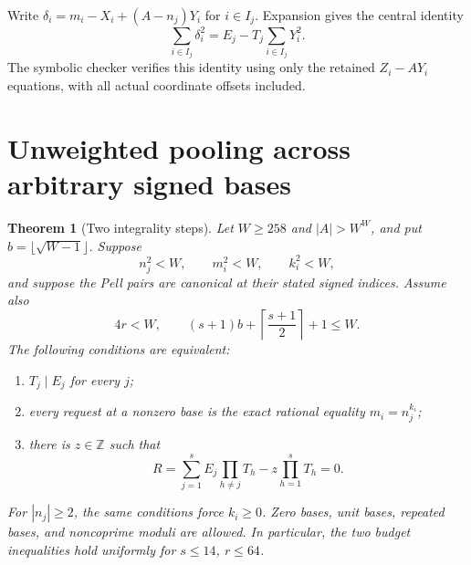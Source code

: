 \documentclass[10pt,letterpaper]{article}
\newtheorem{theorem}{Theorem}[section]
\theoremstyle{remark}\newtheorem{remark}[theorem]{Remark}
\newcommand{\Z}{\mathbb Z}\newcommand{\Q}{\mathbb Q}\newcommand{\N}{\mathbb N}
\begin{document}
Write $\delta_i=m_i-X_i+(A-n_j)Y_i$ for $i\in I_j$. Expansion gives
the central identity
\begin{equation}
 \sum_{i\in I_j}\delta_i^2
 =E_j-T_j\sum_{i\in I_j}Y_i^2.\label{eq:normidentity}
\end{equation}
The symbolic checker verifies this identity using only the retained
$Z_i-AY_i$ equations, with all actual coordinate offsets included.

\section{Unweighted pooling across arbitrary signed bases}

\begin{theorem}[Two integrality steps]\label{thm:main}
Let $W\ge258$ and $|A|>W^W$, and put
$b=\lfloor\sqrt{W-1}\rfloor$. Suppose
\[
 n_j^2<W,\qquad m_i^2<W,\qquad k_i^2<W,
\]
and suppose the Pell pairs are canonical at their stated signed indices.
Assume also
\begin{equation}
 4r<W,\qquad
 (s+1)b+\left\lceil\frac{s+1}{2}\right\rceil+1\le W.
 \label{eq:budget}
\end{equation}
The following conditions are equivalent:
\begin{enumerate}
\item $T_j\mid E_j$ for every $j$;
\item every request at a nonzero base is the exact rational equality
      $m_i=n_j^{k_i}$;
\item there is $z\in\Z$ such that
\begin{equation}
 \boxed{\quad
 R=\sum_{j=1}^{s}E_j\prod_{h\ne j}T_h
       -z\prod_{h=1}^{s}T_h=0.\quad}\label{eq:pooled}
\end{equation}
\end{enumerate}
For $|n_j|\ge2$, the same conditions force $k_i\ge0$.
Zero bases, unit bases, repeated bases, and noncoprime moduli are allowed.
In particular, the two budget inequalities hold uniformly for $s\le14$, $r\le64$.
\end{theorem}
\end{document}
